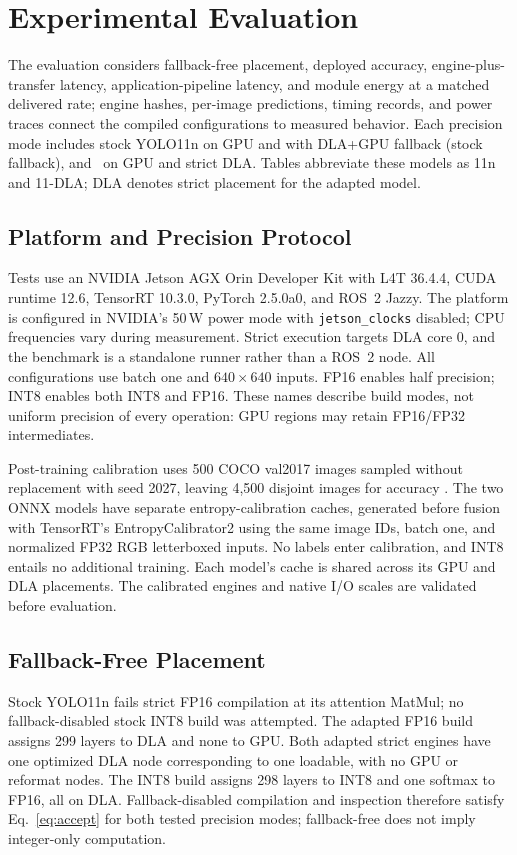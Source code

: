 \section{Experimental Evaluation}
\label{sec:eval}
The evaluation considers fallback-free placement, deployed accuracy,
engine-plus-transfer latency, application-pipeline latency, and module energy
at a matched delivered
rate; engine hashes, per-image predictions, timing records, and power traces
connect the compiled configurations to measured behavior. Each precision mode
includes stock YOLO11n on GPU and with DLA+GPU fallback (stock fallback), and \model\ on GPU
and strict DLA. Tables abbreviate these models as 11n and 11-DLA; DLA denotes
strict placement for the adapted model.

\subsection{Platform and Precision Protocol}
\label{sec:setup}
Tests use an NVIDIA Jetson AGX Orin Developer Kit with L4T 36.4.4, CUDA runtime
12.6, TensorRT 10.3.0, PyTorch 2.5.0a0, and ROS~2 Jazzy. The platform is
configured in NVIDIA's 50\,W power mode with \texttt{jetson\_clocks} disabled;
CPU frequencies vary during measurement. Strict execution targets DLA core 0,
and the benchmark is a standalone runner rather than a ROS~2 node.
All configurations use batch one and $640\times640$ inputs. FP16 enables
half precision; INT8 enables both INT8 and FP16. These names describe build
modes, not uniform precision of every operation: GPU regions may retain
FP16/FP32 intermediates.

Post-training calibration uses 500 COCO val2017 images sampled without
replacement with seed 2027, leaving 4,500 disjoint images for accuracy
\cite{lin2014coco}. The two ONNX models have separate entropy-calibration
caches, generated before fusion with TensorRT's EntropyCalibrator2 using the
same image IDs, batch one, and normalized FP32 RGB letterboxed inputs.
No labels enter calibration, and INT8 entails no additional training. Each
model's cache is shared across its GPU and DLA placements. The calibrated
engines and native I/O scales are validated before evaluation.

\subsection{Fallback-Free Placement}
\label{sec:placement}
Stock YOLO11n fails strict FP16 compilation at its attention MatMul; no
fallback-disabled stock INT8 build was attempted. The
adapted FP16 build assigns 299 layers to DLA and none to GPU. Both adapted
strict engines have one optimized DLA node corresponding to one loadable,
with no GPU or reformat nodes. The INT8 build assigns 298 layers to INT8 and
one softmax to FP16, all on DLA. Fallback-disabled compilation and inspection
therefore satisfy Eq.~\eqref{eq:accept} for both tested precision modes;
fallback-free does not imply integer-only computation.

